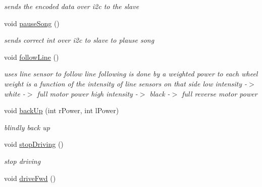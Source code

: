 \begin{DoxyCompactItemize}
\begin{DoxyCompactList}\small\item\em sends the encoded data over i2c to the slave \end{DoxyCompactList}\item 
\hypertarget{classRobot_a7c4cf197187f9f7dcb883ebc58f52b93}{void \hyperlink{classRobot_a7c4cf197187f9f7dcb883ebc58f52b93}{pause\-Song} ()}\label{classRobot_a7c4cf197187f9f7dcb883ebc58f52b93}

\begin{DoxyCompactList}\small\item\em sends correct int over i2c to slave to plause song \end{DoxyCompactList}\item 
\hypertarget{classRobot_a6e3caf6e0346f6a54557eb57a79fc4f4}{void \hyperlink{classRobot_a6e3caf6e0346f6a54557eb57a79fc4f4}{follow\-Line} ()}\label{classRobot_a6e3caf6e0346f6a54557eb57a79fc4f4}

\begin{DoxyCompactList}\small\item\em uses line sensor to follow line following is done by a weighted power to each wheel weight is a function of the intensity of line sensors on that side low intensity -\/$>$ white -\/$>$ full motor power high intensity -\/$>$ black -\/$>$ full reverse motor power \end{DoxyCompactList}\item 
\hypertarget{classRobot_a450cf38f963596663003f3d94b2bcf3b}{void \hyperlink{classRobot_a450cf38f963596663003f3d94b2bcf3b}{back\-Up} (int r\-Power, int l\-Power)}\label{classRobot_a450cf38f963596663003f3d94b2bcf3b}

\begin{DoxyCompactList}\small\item\em blindly back up \end{DoxyCompactList}\item 
\hypertarget{classRobot_a959f64b4829ade78bb332f205b50ee70}{void \hyperlink{classRobot_a959f64b4829ade78bb332f205b50ee70}{stop\-Driving} ()}\label{classRobot_a959f64b4829ade78bb332f205b50ee70}

\begin{DoxyCompactList}\small\item\em stop driving \end{DoxyCompactList}\item 
\hypertarget{classRobot_a35897f5e7b5c8b29cc6d386c6089abea}{void \hyperlink{classRobot_a35897f5e7b5c8b29cc6d386c6089abea}{drive\-Fwd} ()}\label{classRobot_a35897f5e7b5c8b29cc6d386c6089abea}


\end{DoxyCompactItemize}
